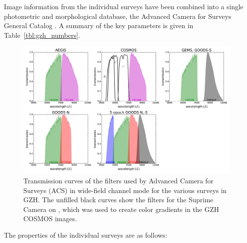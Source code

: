 \documentclass[twocolumn]{aastex6}
\begin{document}
Image information from
the individual surveys have been combined into a single photometric and
morphological database, the Advanced Camera for Surveys General Catalog
\citep[ACS-GC;][]{gri12}. A summary of the key parameters is given in
Table~\ref{tbl:gzh_numbers}. 


\begin{figure}
\center
\includegraphics[width=160mm]{figures/filter_curves.pdf}
\caption{Transmission curves of the filters used by \hst{} Advanced Camera for
Surveys (ACS) in wide-field channel mode for the various surveys in GZH. The
unfilled black curves show the filters for the Suprime Camera on \subaru, which
was used to create color gradients in the GZH COSMOS
images.\label{fig:filtercurves}}
\end{figure}

The properties of the individual surveys are as follows:
\end{document}
